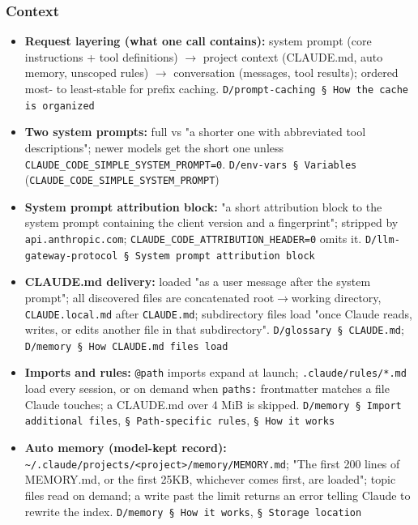 \subsubsection*{Context}
\begin{itemize}
\item \textbf{Request layering (what one call contains):} system prompt (core instructions + tool definitions) $\rightarrow$ project context (CLAUDE.md, auto memory, unscoped rules) $\rightarrow$ conversation (messages, tool results); ordered most- to least-stable for prefix caching. \texttt{D/\allowbreak{}prompt-\allowbreak{}caching § How the cache is organized}
\item \textbf{Two system prompts:} full vs "a shorter one with abbreviated tool descriptions"; newer models get the short one unless \texttt{CLAUDE\_\allowbreak{}CODE\_\allowbreak{}SIMPLE\_\allowbreak{}SYSTEM\_\allowbreak{}PROMPT=0}. \texttt{D/\allowbreak{}env-\allowbreak{}vars § Variables} (\texttt{CLAUDE\_\allowbreak{}CODE\_\allowbreak{}SIMPLE\_\allowbreak{}SYSTEM\_\allowbreak{}PROMPT})
\item \textbf{System prompt attribution block:} "a short attribution block to the system prompt containing the client version and a fingerprint"; stripped by \texttt{api.\allowbreak{}anthropic.\allowbreak{}com}; \texttt{CLAUDE\_\allowbreak{}CODE\_\allowbreak{}ATTRIBUTION\_\allowbreak{}HEADER=0} omits it. \texttt{D/\allowbreak{}llm-\allowbreak{}gateway-\allowbreak{}protocol § System prompt attribution block}
\item \textbf{CLAUDE.md delivery:} loaded "as a user message after the system prompt"; all discovered files are concatenated root$\rightarrow$working directory, \texttt{CLAUDE.\allowbreak{}local.\allowbreak{}md} after \texttt{CLAUDE.\allowbreak{}md}; subdirectory files load "once Claude reads, writes, or edits another file in that subdirectory". \texttt{D/\allowbreak{}glossary § CLAUDE.\allowbreak{}md}; \texttt{D/\allowbreak{}memory § How CLAUDE.\allowbreak{}md files load}
\item \textbf{Imports and rules:} \texttt{@path} imports expand at launch; \texttt{.\allowbreak{}claude/\allowbreak{}rules/\allowbreak{}*.\allowbreak{}md} load every session, or on demand when \texttt{paths:\allowbreak{}} frontmatter matches a file Claude touches; a CLAUDE.md over 4 MiB is skipped. \texttt{D/\allowbreak{}memory § Import additional files}, \texttt{§ Path-\allowbreak{}specific rules}, \texttt{§ How it works}
\item \textbf{Auto memory (model-kept record):} \texttt{\textasciitilde{}/\allowbreak{}.\allowbreak{}claude/\allowbreak{}projects/\allowbreak{}<project>/\allowbreak{}memory/\allowbreak{}MEMORY.\allowbreak{}md}; "The first 200 lines of MEMORY.md, or the first 25KB, whichever comes first, are loaded"; topic files read on demand; a write past the limit returns an error telling Claude to rewrite the index. \texttt{D/\allowbreak{}memory § How it works}, \texttt{§ Storage location}

\end{itemize}
